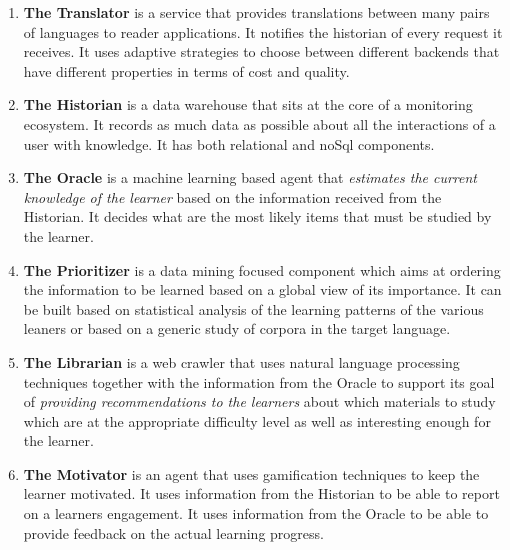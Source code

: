 \newcommand {\archiblock}[1]{\item {\bf #1}}
\begin{enumerate}

		\archiblock{The Translator} is a service that provides translations between many pairs of languages to reader applications. It notifies the historian of every request it receives. 
		It uses adaptive strategies to choose between different backends that have different properties in terms of cost and quality.

		\archiblock{The Historian} is a data warehouse that sits at the core of a monitoring ecosystem. It records as much data as possible about all the interactions of a user with knowledge. 
		It has both relational and noSql components.

		\archiblock{The Oracle} is a machine learning based agent that {\em estimates the current knowledge of the learner} based on the information received from the Historian. It decides what are the most likely items that must be studied by the learner. 
		\archiblock{The Prioritizer} is a data mining focused component which aims at ordering the information to be learned based on a global view of its importance. It can be built based on statistical analysis of the learning patterns of the various leaners or based on a generic study of corpora in the target language.


		\archiblock {The Librarian} is a web crawler that uses natural language processing techniques together with the information from the Oracle to support its goal of {\em providing recommendations to the learners} about which materials to study which are at the appropriate difficulty level as well as interesting enough for the learner.

		\archiblock {The Motivator} is an agent that uses gamification techniques to keep the learner motivated. It uses information from the Historian to be able to report on a learners engagement. It uses information from the Oracle to be able to provide feedback on the actual learning progress. 

\end{enumerate}





